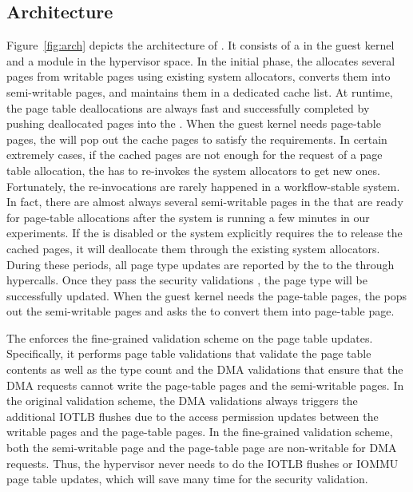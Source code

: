\subsection{\name Architecture}
Figure~\ref{fig:arch} depicts the architecture of \name. It consists of a \cache in the guest kernel and a \name module in the hypervisor space. 
In the initial phase, the \cache allocates several pages from writable pages using existing system allocators, converts them into semi-writable pages, and maintains them in a dedicated cache list.
At runtime, the page table deallocations are always fast and successfully completed by pushing deallocated pages into the \cache.
When the guest kernel needs page-table pages, the \cache  will pop out the cache pages to satisfy the requirements.
In certain extremely cases, if the cached pages are not enough for the request of a page table allocation, the \cache has to re-invokes the system allocators to get new ones.
Fortunately, the re-invocations are rarely happened in a workflow-stable system. 
In fact, there are almost always several semi-writable pages in the \cache that are ready for page-table allocations after the system is running a few minutes in our experiments.
If the \cache is disabled or the system explicitly requires the \cache to release the cached pages, it will deallocate them through the existing system allocators.
During these periods, all page type updates are reported by the \cache to the \module through hypercalls. Once they pass the security validations , the page type will be successfully updated.
When the guest kernel needs the page-table pages, the \cache pops out the semi-writable pages and asks the \module to convert them into page-table page.

The \module enforces the fine-grained validation scheme on the page table updates. 
Specifically, it performs page table validations that validate the page table contents as well as the type count and the DMA validations that ensure that the DMA requests cannot write the page-table pages and the semi-writable pages.
In the original validation scheme, the DMA validations always triggers the additional IOTLB flushes due to the access permission updates between the writable pages and the page-table pages.
In the fine-grained validation scheme, both the semi-writable page and the page-table page are non-writable for DMA requests. 
Thus, the hypervisor never needs to do the IOTLB flushes or IOMMU page table updates, which will save many time for the security validation.

